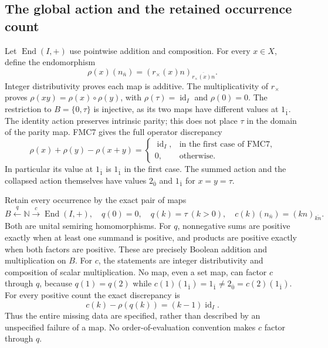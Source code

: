 \subsection{The global action and the retained occurrence count}
Let $\operatorname{End}(I,+)$ use pointwise addition and composition.
For every $x\in X$, define the endomorphism
\begin{equation}\tag{FMC8}
\rho(x)(n_{\bar n})=
(r_\times(x)n)_{\overline{r_\times(x)n}}.
\end{equation}
Integer distributivity proves each map is additive. The
multiplicativity of $r_\times$ proves
$\rho(xy)=\rho(x)\circ\rho(y)$, with
$\rho(\tau)=\operatorname{id}_I$ and $\rho(0)=0$.
The restriction to $B=\{0,\tau\}$ is injective, as its two maps
have different values at $1_{\bar1}$.
The identity action preserves intrinsic parity; this does not place
$\tau$ in the domain of the parity map.
FMC7 gives the full operator discrepancy
\begin{equation}\tag{FMC9}
\rho(x)+\rho(y)-\rho(x+y)=
\begin{cases}\operatorname{id}_I,&\text{in the first case of FMC7},\\
0,&\text{otherwise}.
\end{cases}
\end{equation}
In particular its value at $1_{\bar1}$ is $1_{\bar1}$ in the first
case. The summed action and the collapsed action themselves have
values $2_{\bar0}$ and $1_{\bar1}$ for $x=y=\tau$.

Retain every occurrence by the exact pair of maps
\begin{equation}\tag{FMC10}
B\xleftarrow{q}\mathbb N\xrightarrow{c}\operatorname{End}(I,+),
\quad q(0)=0,\quad q(k)=\tau\ (k>0),\quad
c(k)(n_{\bar n})=(kn)_{\overline{kn}}.
\end{equation}
Both are unital semiring homomorphisms. For $q$, nonnegative sums
are positive exactly when at least one summand is positive, and
products are positive exactly when both factors are positive.
These are precisely Boolean addition and multiplication on $B$.
For $c$, the statements are integer distributivity and composition
of scalar multiplication. No map, even a set map, can factor $c$
through $q$, because $q(1)=q(2)$ while
$c(1)(1_{\bar1})=1_{\bar1}\ne2_{\bar0}=c(2)(1_{\bar1})$.
For every positive count the exact discrepancy is
\begin{equation}\tag{FMC11}
c(k)-\rho(q(k))=(k-1)\operatorname{id}_I.
\end{equation}
Thus the entire missing data are specified, rather than described
by an unspecified failure of a map. No order-of-evaluation convention
makes $c$ factor through $q$.

